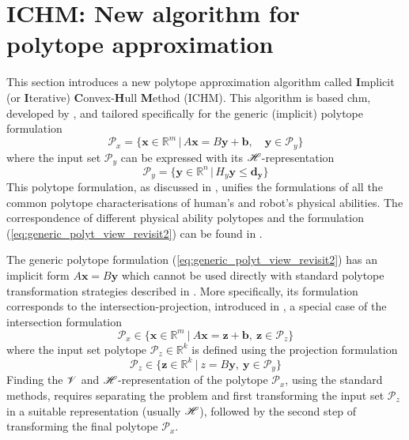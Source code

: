 \section{ICHM: New algorithm for polytope approximation}
\label{ch:algorihtm_ichm}

This section introduces a new polytope approximation algorithm called \textbf{I}mplicit (or \textbf{I}terative) \textbf{C}onvex-\textbf{H}ull \textbf{M}ethod (ICHM). This algorithm is based \gls{chm}, developed by \citet{lassez1992quantifier}, and tailored specifically for the generic (implicit) polytope formulation 
\begin{equation}
    \mathcal{P}_x = \big\{ \bm{x}\in \mathbb{R}^{m}\, |\,A\bm{x} = B\bm{y} + \bm{b}, \quad  \bm{y}\in\mathcal{P}_y  \big\}
    \label{eq:generic_polyt_view_revisit2}
\end{equation}
where the input set $\mathcal{P}_y$ can be expressed with its $\mathscr{H}$-representation
\begin{equation}
    \mathcal{P}_y = \big\{ \bm{y}\in \mathbb{R}^{n}\, |\,H_y\bm{y} \leq \bm{d_y}\big\}
    \label{eq:generic_poly_input_set_revisit2}
\end{equation} 
This polytope formulation, as discussed in , unifies the formulations of all the common polytope characterisations of human's and robot's physical abilities. The correspondence of different physical ability polytopes and the formulation (\ref{eq:generic_polyt_view_revisit2}) can be found in . 

The generic polytope formulation (\ref{eq:generic_polyt_view_revisit2}) has an implicit form $A\bm{x}=B\bm{y}$ which cannot be used directly with standard polytope transformation strategies described in . More specifically, its formulation corresponds to the intersection-projection, introduced in , a special case of the intersection formulation 
\begin{equation}
    \mathcal{P}_x \in \{\bm{x}\in \mathbb{R}^m~|~A \bm{x} = \bm{z} + \bm{b},~ \bm{z} \in \mathcal{P}_z\} 
\end{equation}
where the input set polytope $\mathcal{P}_z\in\mathbb{R}^k$ is defined using the projection formulation
\begin{equation}
    \mathcal{P}_z \in \{\bm{z}\in \mathbb{R}^k~|~z = B\bm{y},~ \bm{y} \in \mathcal{P}_y\} 
\end{equation}
Finding the $\mathscr{V}$ and $\mathscr{H}$-representation of the polytope $\mathcal{P}_x$, using the standard methods, requires separating the problem and first transforming the input set $\mathcal{P}_z$ in a suitable representation (usually $\mathscr{H}$), followed by the second step of transforming the final polytope $\mathcal{P}_x$. 

